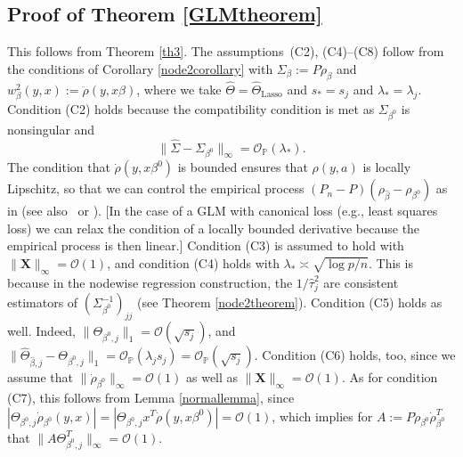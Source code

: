 \documentclass[aos,MSNbibl,dvips]{arximspdf}
\newcommand{\PP}{\mathbb{P}}
\newcommand{\bx}{\mathbf{X}}
\begin{document}
\subsection{Proof of Theorem \protect\ref{GLMtheorem}}\label
{GLMtheoremsection}
This follows from Theorem \ref{th3}.
The assumptions~(C2), (C4)--(C8)
follow from the conditions of Corollary \ref{node2corollary} with
$\Sigma_{\beta}:= P \ddot\rho_{\beta}$ and
$w_{\beta}^2 (y,x):= \ddot\rho(y, x \beta) $,
where we take $\hat\Theta= \hat\Theta_{\mathrm{Lasso}}$
and $s_* = s_j$ and $\lambda_* = \lambda_j $.
Condition (C2) holds because the compatibility condition is met as
$\Sigma_{\beta^0}$ is nonsingular and
%
\[
\| \hat\Sigma- \Sigma_{\beta^0} \|_{\infty} = { \mathcal
O}_{\PP} ( \lambda_*). %
\]
%
The condition that
$\dot\rho(y, x \beta^0) $ is bounded ensures that $\rho(y,a)$ is
locally Lipschitz, so that we can control the empirical process
$(P_n- P) ( \rho_{\hat\beta} - \rho_{\beta^0} ) $ as in \cite
{geer07} (see also~\cite{pbvdg11} or \cite{Mueller11}). [In the case of a GLM with
canonical loss
(e.g., least squares loss) we can relax the
condition of a locally bounded derivative because the empirical process
is then linear.]
Condition (C3) is assumed to hold with $\|\bx\|_{\infty} = {\mathcal O}
(1) $, and condition (C4) holds with $\lambda_* \asymp\sqrt{\log p/
n} $.
This is because
in the nodewise regression construction,
the $1/ \hat\tau_j^2$ are consistent estimators of $(\Sigma_{\beta
^0}^{-1} )_{jj}$
(see Theorem \ref{node2theorem}).
Condition (C5) holds as well. Indeed, $ \| \Theta_{\beta^0,j }\|_1 =
{\mathcal O} (\sqrt{s_j})$, and
$\| \hat\Theta_{\hat{\beta},j}- \Theta_{\beta^0, j} \|_1 =
{\mathcal
O}_{\PP}(
\lambda_j s_j) = {\mathcal O}_{\PP} ( \sqrt{s_j}) $.
Condition (C6) holds, too, since we assume that $\| \dot\rho_{\beta
^0} \|_{\infty} = {\mathcal O} (1)$ as well as
$\|\bx\|_{\infty} = {\mathcal O} (1)$.
As for condition (C7), this follows from Lemma \ref{normallemma}, since
$| \Theta_{\beta^0,j}\dot\rho_{\beta^0} (y,x) | =| \Theta_{\beta^0,j}
x^T \dot\rho(y, x \beta^0) | = {\mathcal O} (1)$, which implies
for $A:= P \dot\rho_{\beta^0} \dot\rho_{\beta^0}^T $ that
$ \| A \Theta_{\beta^0,j}^T \|_{\infty} ={\mathcal O} (1) $. %

\begin{supplement}[id=suppA]
\end{supplement}
\end{document}
